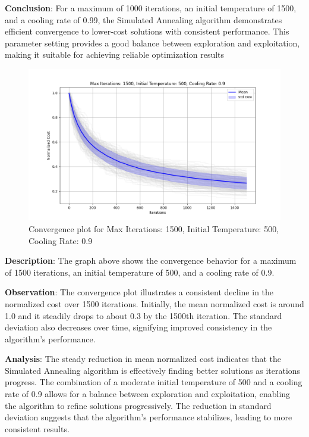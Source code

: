 \documentclass[
]{article}
\begin{document}
    \textbf{Conclusion}: For a maximum of 1000 iterations, an initial temperature of 1500, and a cooling rate of 0.99, the Simulated Annealing algorithm demonstrates efficient convergence to lower-cost solutions with consistent performance. This parameter setting provides a good balance between exploration and exploitation, making it suitable for achieving reliable optimization results

    \begin{figure}[H]
        \centering
        \includegraphics[width=\textwidth]{simulated_annealing/max_iter_1500_init_temp_500_cooling_rate_0.9}
        \caption{Convergence plot for Max Iterations: 1500, Initial Temperature: 500, Cooling Rate: 0.9}
        \label{fig:sa_1500_500_0.9}
    \end{figure}

    \textbf{Description}: The graph above shows the convergence behavior for a maximum of 1500 iterations, an initial temperature of 500, and a cooling rate of 0.9.

    \textbf{Observation}: The convergence plot illustrates a consistent decline in the normalized cost over 1500 iterations. Initially, the mean normalized cost is around 1.0 and it steadily drops to about 0.3 by the 1500th iteration. The standard deviation also decreases over time, signifying improved consistency in the algorithm’s performance.

    \textbf{Analysis}: The steady reduction in mean normalized cost indicates that the Simulated Annealing algorithm is effectively finding better solutions as iterations progress. The combination of a moderate initial temperature of 500 and a cooling rate of 0.9 allows for a balance between exploration and exploitation, enabling the algorithm to refine solutions progressively. The reduction in standard deviation suggests that the algorithm's performance stabilizes, leading to more consistent results.
\end{document}
